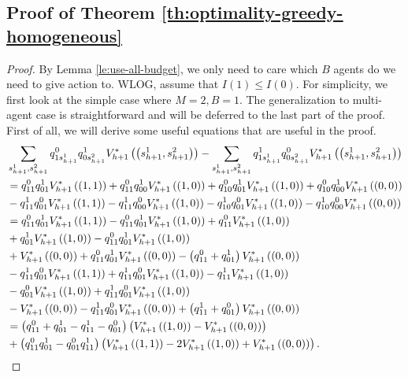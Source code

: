 \subsection{Proof of Theorem \ref{th:optimality-greedy-homogeneous}}\label{app:thm-optimality-greedy-homogeneous}
\optimalityhomogeneous*
\begin{proof}
By Lemma \ref{le:use-all-budget}, we only need to care which $B$ agents do we need to give action to. WLOG, assume that $I(1)\leq I(0)$. For simplicity, we first look at the simple case where $M=2,B=1$. The generalization to multi-agent case is straightforward and will be deferred to the last part of the proof. First of all, we will derive some useful equations that are useful in the proof.
\begin{align}
    &\sum_{s_{h+1}^1,s_{h+1}^2}q^0_{1s_{h+1}^1}q^1_{0s_{h+1}^2}V_{h+1}^*\left(\left(s_{h+1}^1,s_{h+1}^2\right)\right)-  \sum_{s_{h+1}^1,s_{h+1}^2}q^1_{1s_{h+1}^1}q^0_{0s_{h+1}^2}V_{h+1}^*\left(\left(s_{h+1}^1,s_{h+1}^2\right)\right)\notag\\
    &=q^0_{11}q^1_{01}V_{h+1}^*\left((1,1)\right)+q^0_{11}q^1_{00}V_{h+1}^*\left((1,0)\right)+q^0_{10}q^1_{01}V_{h+1}^*\left((1,0)\right)+q^0_{10}q^1_{00}V_{h+1}^*\left((0,0)\right)\notag\\
    &-q^1_{11}q^0_{01}V_{h+1}^*\left((1,1)\right)-q^1_{11}q^0_{00}V_{h+1}^*\left((1,0)\right)-q^1_{10}q^0_{01}V_{h+1}^*\left((1,0)\right)-q^1_{10}q^0_{00}V_{h+1}^*\left((0,0)\right)\notag\\
    &=q^0_{11}q^1_{01}V_{h+1}^*\left((1,1)\right)-q^0_{11}q^1_{01}V_{h+1}^*\left((1,0)\right)+q^0_{11}V_{h+1}^*\left((1,0)\right)\notag\\
    &+q^1_{01}V_{h+1}^*\left((1,0)\right)-q^0_{11}q^1_{01}V_{h+1}^*\left((1,0)\right)\notag\\
    &+V_{h+1}^*\left((0,0)\right)+q^0_{11}q^1_{01}V_{h+1}^*\left((0,0)\right)-\left(q^0_{11}+q^1_{01}\right)V_{h+1}^*\left((0,0)\right)\notag\\
     &-q^1_{11}q^0_{01}V_{h+1}^*\left((1,1)\right)+q^1_{11}q^0_{01}V_{h+1}^*\left((1,0)\right)-q^1_{11}V_{h+1}^*\left((1,0)\right)\notag\\
    &-q^0_{01}V_{h+1}^*\left((1,0)\right)+q^1_{11}q^0_{01}V_{h+1}^*\left((1,0)\right)\notag\\
    &-V_{h+1}^*\left((0,0)\right)-q^1_{11}q^0_{01}V_{h+1}^*\left((0,0)\right)+\left(q^1_{11}+q^0_{01}\right)V_{h+1}^*\left((0,0)\right)\notag\\
    &= \left(q^0_{11}+q^1_{01}-q^1_{11}-q^0_{01}\right)\left(V_{h+1}^*\left((1,0)\right)-V_{h+1}^*\left((0,0)\right)\right)\notag\\&+\left(q^0_{11}q^1_{01}-q^0_{01}q^1_{11}\right)\left(V_{h+1}^*\left((1,1)\right)-2V_{h+1}^*\left((1,0)\right)+V_{h+1}^*\left((0,0)\right)\right).\label{eq:simplification-optimality-equation}
\end{align}


\end{proof}
